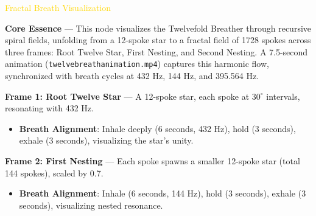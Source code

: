 \textcolor{gold}{ Fractal Breath Visualization }

\textbf{Core Essence} --- This node visualizes the Twelvefold Breather through recursive spiral fields, unfolding from a 12-spoke star to a fractal field of 1728 spokes across three frames: Root Twelve Star, First Nesting, and Second Nesting. A 7.5-second animation (\texttt{twelvebreathanimation.mp4}) captures this harmonic flow, synchronized with breath cycles at 432 Hz, 144 Hz, and 395.564 Hz.

\textbf{Frame 1: Root Twelve Star} --- A 12-spoke star, each spoke at \(30^\circ\) intervals, resonating with 432 Hz.
\begin{itemize}
    \item \textbf{Breath Alignment}: Inhale deeply (6 seconds, 432 Hz), hold (3 seconds), exhale (3 seconds), visualizing the star’s unity.
\end{itemize}
\begin{center}
\end{center}

\textbf{Frame 2: First Nesting} --- Each spoke spawns a smaller 12-spoke star (total 144 spokes), scaled by 0.7.
\begin{itemize}
    \item \textbf{Breath Alignment}: Inhale (6 seconds, 144 Hz), hold (3 seconds), exhale (3 seconds), visualizing nested resonance.
\end{itemize}
\begin{center}
\end{center}

